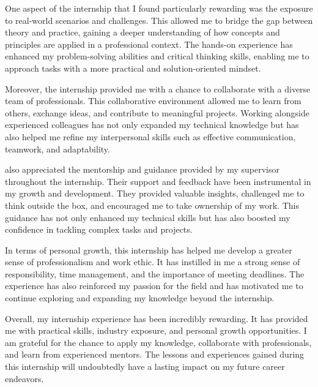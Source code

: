 One aspect of the internship that I found particularly rewarding was the exposure to real-world scenarios and challenges. This allowed me to bridge the gap between theory and practice, gaining a deeper understanding of how concepts and principles are applied in a professional context. 
The hands-on experience has enhanced my problem-solving abilities and critical thinking skills, enabling me to approach tasks with a more practical and solution-oriented mindset.

Moreover, the internship provided me with a chance to collaborate with a diverse team of professionals. This collaborative environment allowed me to learn from others, exchange ideas, and contribute to meaningful projects. 
Working alongside experienced colleagues has not only expanded my technical knowledge but has also helped me refine my interpersonal skills such as effective communication, teamwork, and adaptability.

also appreciated the mentorship and guidance provided by my supervisor throughout the internship. 
Their support and feedback have been instrumental in my growth and development. They provided valuable insights, challenged me to think outside the box, and encouraged me to take ownership of my work. 
This guidance has not only enhanced my technical skills but has also boosted my confidence in tackling complex tasks and projects.

In terms of personal growth, this internship has helped me develop a greater sense of professionalism and work ethic. It has instilled in me a strong sense of responsibility, time management, and the importance of meeting deadlines. 
The experience has also reinforced my passion for the field and has motivated me to continue exploring and expanding my knowledge beyond the internship.

Overall, my internship experience has been incredibly rewarding. It has provided me with practical skills, industry exposure, and personal growth opportunities. 
I am grateful for the chance to apply my knowledge, collaborate with professionals, and learn from experienced mentors. The lessons and experiences gained during this internship will undoubtedly have a lasting impact on my future career endeavors.